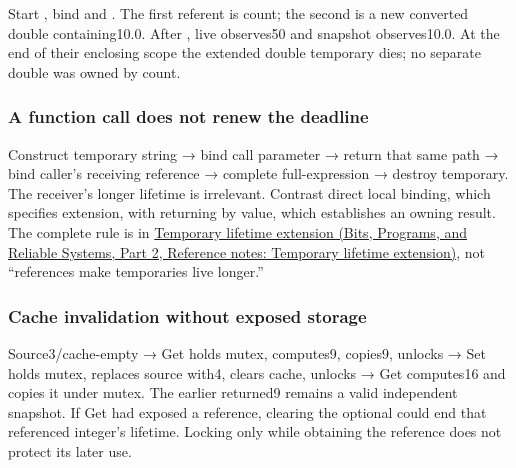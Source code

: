 \hypertarget{appendix-92ff77d4dfdc-direct-alias-versus-converted-snapshot}{}

Start , bind  and . The first referent is count; the second is a new converted double containing10.0. After , live observes50 and snapshot observes10.0. At the end of their enclosing scope the extended double temporary dies; no separate double was owned by count.

\subsubsection{A function call does not renew the deadline}\label{appendix-92ff77d4dfdc-a-function-call-does-not-renew-the-deadline}

\hypertarget{appendix-92ff77d4dfdc-a-function-call-does-not-renew-the-deadline}{}

Construct temporary string → bind call parameter → return that same path → bind caller's receiving reference → complete full-expression → destroy temporary. The receiver's longer lifetime is irrelevant. Contrast direct local binding, which specifies extension, with returning  by value, which establishes an owning result. The complete rule is in \href{../01-Bits-Programs-and-Reliable-Systems-P02/main.pdf\#nameddest=appendix-a978b29bbbb0}{Temporary lifetime extension (Bits, Programs, and Reliable Systems, Part 2, Reference notes: Temporary lifetime extension)}, not ``references make temporaries live longer.''

\subsubsection{Cache invalidation without exposed storage}\label{appendix-92ff77d4dfdc-cache-invalidation-without-exposed-storage}

\hypertarget{appendix-92ff77d4dfdc-cache-invalidation-without-exposed-storage}{}

Source3/cache-empty → Get holds mutex, computes9, copies9, unlocks → Set holds mutex, replaces source with4, clears cache, unlocks → Get computes16 and copies it under mutex. The earlier returned9 remains a valid independent snapshot. If Get had exposed a reference, clearing the optional could end that referenced integer's lifetime. Locking only while obtaining the reference does not protect its later use.

